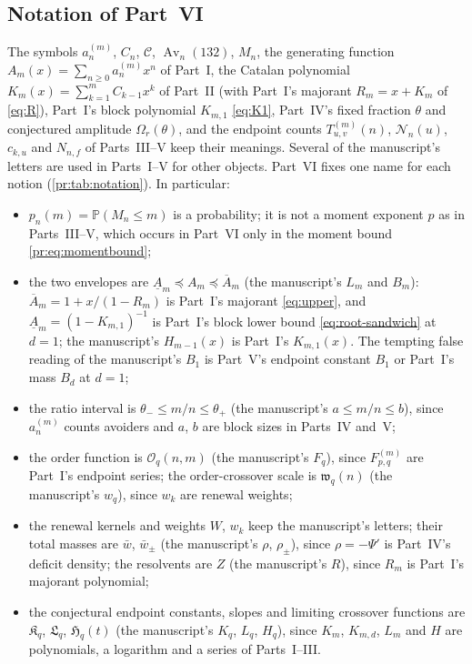 \documentclass[11pt,a4paper]{article}
\theoremstyle{definition}\newaliascnt{definition}{theorem}
\theoremstyle{remark}\newaliascnt{remark}{theorem}
\newcommand{\Av}{\operatorname{Av}}
\newcommand{\Cat}{\mathcal C}
\newcommand{\preceqc}{\preceq}
\newcommand{\ljP}{\mathbb P}
\begin{document}
\subsection{Notation of Part~VI}
\label{pr:sec:notation}
The symbols $a_n^{(m)}$, $C_n$, $\Cat$, $\Av_n(132)$, $M_n$, the generating
function $A_m(x)=\sum_{n\ge0}a_n^{(m)}x^n$ of Part~I, the Catalan polynomial
$K_m(x)=\sum_{k=1}^mC_{k-1}x^k$ of Part~II (with Part~I's majorant
$R_m=x+K_m$ of \eqref{eq:R}), Part~I's block polynomial $K_{m,1}$
\eqref{eq:K1}, Part~IV's fixed fraction $\theta$ and conjectured amplitude
$\Omega_r(\theta)$, and the endpoint counts $T^{(m)}_{u,v}(n)$,
$\mathcal N_n(u)$, $c_{k,u}$ and $N_{n,f}$ of Parts~III--V keep their
meanings. Several of the manuscript's letters are used in Parts~I--V for
other objects. Part~VI fixes one name for each notion
(\cref{pr:tab:notation}). In particular:
\begin{itemize}
\item $p_n(m)=\ljP(M_n\le m)$ is a probability; it is not a moment exponent
 $p$ as in Parts~III--V, which occurs in Part~VI only in the moment bound
 \eqref{pr:eq:momentbound};
\item the two envelopes are $\underline A_m\preceqc A_m\preceqc\overline A_m$
 (the manuscript's $L_m$ and $B_m$): $\overline A_m=1+x/(1-R_m)$ is Part~I's
 majorant \eqref{eq:upper}, and $\underline A_m=(1-K_{m,1})^{-1}$ is
 Part~I's block lower bound \eqref{eq:root-sandwich} at $d=1$; the
 manuscript's $H_{m-1}(x)$ is Part~I's $K_{m,1}(x)$. The tempting false
 reading of the manuscript's $B_1$ is Part~V's endpoint constant $B_1$ or
 Part~I's mass $B_d$ at $d=1$;
\item the ratio interval is $\theta_-\le m/n\le\theta_+$ (the manuscript's
 $a\le m/n\le b$), since $a_n^{(m)}$ counts avoiders and $a$, $b$ are block
 sizes in Parts~IV and~V;
\item the order function is $\mathcal O_q(n,m)$ (the manuscript's $F_q$),
 since $F^{(m)}_{p,q}$ are Part~I's endpoint series; the order-crossover
 scale is $\mathfrak w_q(n)$ (the manuscript's $w_q$), since $w_k$ are
 renewal weights;
\item the renewal kernels and weights $W$, $w_k$ keep the manuscript's
 letters; their total masses are $\bar w$, $\bar w_\pm$ (the manuscript's
 $\rho$, $\rho_\pm$), since $\rho=-\Psi'$ is Part~IV's deficit density; the
 resolvents are $Z$ (the manuscript's $R$), since $R_m$ is Part~I's
 majorant polynomial;
\item the conjectural endpoint constants, slopes and limiting crossover
 functions are $\mathfrak K_q$, $\mathfrak L_q$, $\mathfrak H_q(t)$ (the
 manuscript's $K_q$, $L_q$, $H_q$), since $K_m$, $K_{m,d}$, $L_m$ and $H$
 are polynomials, a logarithm and a series of Parts~I--III.
\end{itemize}
\end{document}

